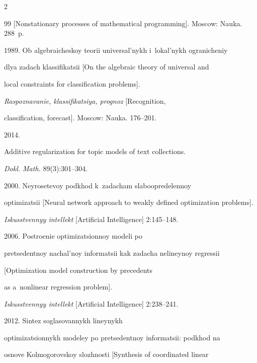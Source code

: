 \begin{multicols}{2}
{{\begin{thebibliography}{99}
[Nonstationary processes of mathematical programming]. Moscow: Nauka. 288~p.






 1989. Ob algebraicheskoy teorii universal'nykh i~lokal'nykh ogranicheniy 


 dlya zadach klassifikatsii [On the algebraic theory of universal and 


 local constraints for classification problems]. 


 \textit{Raspoznavanie, klassifikatsiya, prognoz} [Recognition,


  classification, forecast]. Moscow: Nauka. 176--201.




 2014. 


Additive regularization for topic models of text collections. 


\textit{Dokl. Math.} 89(3):301--304.







 2000. Neyrosetevoy podkhod k~zadacham slaboopredelennoy 


optimizatsii [Neural network approach to weakly defined optimization problems].


\textit{Iskusstvennyy intellekt} [Artificial Intelligence] 2:145--148.







 2006. Postroenie optimizatsionnoy modeli po 


pretsedentnoy nachal'noy informatsii kak zadacha nelineynoy regressii 


[Optimization model construction   by precedents 


as a~nonlinear regression problem]. 


\textit{Iskusstvennyy intellekt} [Artificial Intelligence] 2:238--241.




 2012. Sintez soglasovannykh lineynykh


op\-ti\-mi\-za\-tsi\-on\-nykh modeley po pretsedentnoy informatsii: podkhod na 


osnove Kolmogorovskoy slozhnosti [Synthesis of coordinated linear



\end{thebibliography}}}
\end{multicols}
